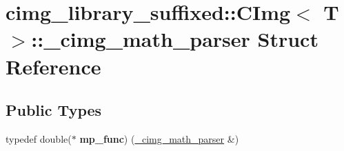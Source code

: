 \hypertarget{structcimg__library__suffixed_1_1CImg_1_1__cimg__math__parser}{}\section{cimg\+\_\+library\+\_\+suffixed\+:\+:C\+Img$<$ T $>$\+:\+:\+\_\+cimg\+\_\+math\+\_\+parser Struct Reference}
\label{structcimg__library__suffixed_1_1CImg_1_1__cimg__math__parser}
\subsection*{Public Types}
\begin{DoxyCompactItemize}
\item 
\mbox{\label{structcimg__library__suffixed_1_1CImg_1_1__cimg__math__parser_a220deac105e68eef2ee2e612c96a0f75}} 
typedef double($\ast$ {\bfseries mp\+\_\+func}) (\hyperlink{structcimg__library__suffixed_1_1CImg_1_1__cimg__math__parser}{\+\_\+cimg\+\_\+math\+\_\+parser} \&)
\end{DoxyCompactItemize}
